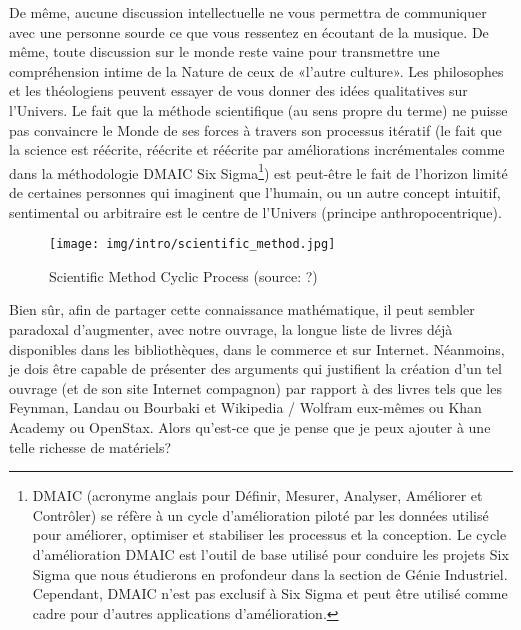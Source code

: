	De même, aucune discussion intellectuelle ne vous permettra de communiquer avec une personne sourde ce que vous ressentez en écoutant de la musique. De même, toute discussion sur le monde reste vaine pour  transmettre une compréhension intime de la Nature de ceux de «l'autre culture». Les philosophes et les théologiens peuvent essayer de vous donner des idées qualitatives sur l'Univers. Le fait que la méthode scientifique (au sens propre du terme) ne puisse pas convaincre le Monde de ses forces à travers son processus itératif (le fait que la science est réécrite, réécrite et réécrite par améliorations incrémentales comme dans la méthodologie DMAIC Six Sigma\footnote{DMAIC (acronyme anglais pour Définir, Mesurer, Analyser, Améliorer et Contrôler) se réfère à un cycle d'amélioration piloté par les données utilisé pour améliorer, optimiser et stabiliser les processus et la conception. Le cycle d'amélioration DMAIC est l'outil de base utilisé pour conduire les projets Six Sigma que nous étudierons en profondeur dans la section de Génie Industriel. Cependant, DMAIC n'est pas exclusif à Six Sigma et peut être utilisé comme cadre pour d'autres applications d'amélioration.}) est peut-être le fait de l'horizon limité de certaines personnes qui imaginent que l'humain, ou un autre concept intuitif, sentimental ou arbitraire est le centre de l'Univers (principe anthropocentrique).
	\begin{figure}[H]
		\centering
		\texttt{[image: img/intro/scientific\_method.jpg]}
		\caption[Scientific Method Cyclic Process]{Scientific Method Cyclic Process (source: ?)}
	\end{figure}
	Bien sûr, afin de partager cette connaissance mathématique, il peut sembler paradoxal d'augmenter, avec notre ouvrage, la longue liste de livres déjà disponibles dans les bibliothèques, dans le commerce et sur Internet. Néanmoins, je dois être capable de présenter des arguments qui justifient la création d'un tel ouvrage (et de son site Internet compagnon) par rapport à des livres tels que les Feynman, Landau ou Bourbaki et Wikipedia / Wolfram eux-mêmes ou Khan Academy ou OpenStax. Alors qu'est-ce que je pense que je peux ajouter à une telle richesse de matériels?

